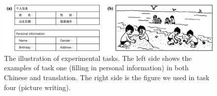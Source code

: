 \begin{figure}[!tbh]
	\includegraphics[width=0.9\linewidth]{figures/study1_task.png}
	\centering
	\caption{The illustration of experimental tasks. The left side shows the examples of task one (filling in personal information) in both Chinese and translation. The right side is the figure we used in task four (picture writing).}
	\label{fig:study1_task}
\end{figure}


